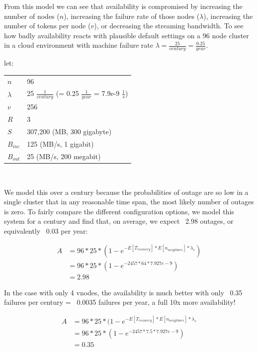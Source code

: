 \documentclass{article}
\makeatletter
\newenvironment{conditions}[1][let:]
  {#1 \begin{tabular}[t]{>{$}l<{$} @{${}={}$} l}}
  {\end{tabular}\\[\belowdisplayskip]}
\makeatother
\begin{document}
From this model we can see that availability is compromised by increasing the
number of nodes ($n$), increasing the failure rate of those nodes ($\lambda$),
increasing the number of tokens per node ($v$), or decreasing the streaming
bandwidth. To see how badly availability reacts with plausible default settings
on a 96 node cluster in a cloud environment with machine failure rate
$\lambda=\frac{25}{century}=\frac{0.25}{year}$.

\begin{conditions}
 n       &  96 \\
 \lambda &  25 $\frac{1}{century}$ (= 0.25 $\frac{1}{year}$ = 7.9e-9 $\frac{1}{s}$) \\
 v       &  256 \\
 R       &  3 \\
 S       &  307,200 (MB, 300 gigabyte) \\
 B_{inc} &  125 (MB/s, 1 gigabit) \\
 B_{out} &  25 (MB/s, 200 megabit) \\
\end{conditions}

We model this over a century because the probabilities of outage are so low in a
single cluster that in any reasonable time span, the most likely number of outages
is zero. To fairly compare the different configuration options, we model this
system for a century and find that, on average, we expect ~2.98 outages, or
equivalently ~0.03 per year:

\begin{equation}
    \begin{split}
    A & = 96 * 25 * (1 - e^{-E[T_{recovery}] * E[n_{neighbors}] * \lambda_{s}}) \\
    & = 96 * 25 * (1 - e^{-2457 * 64 * 7.927e-9}) \\
    & = 2.98
    \end{split}
\end{equation}

In the case with only 4 vnodes, the availability is much better with
only ~0.35 failures per century = ~0.0035 failures per year, a full 10x more
availability!

\begin{equation}
    \begin{split}
    A & = 96 * 25 * (1 - e^{-E[T_{recovery}] * E[n_{neighbors}] * \lambda_{s}} \\
    & = 96 * 25 * (1 - e^{-2457 * 7.5 * 7.927e-9}) \\
    & = 0.35
    \end{split}
\end{equation}
\end{document}
